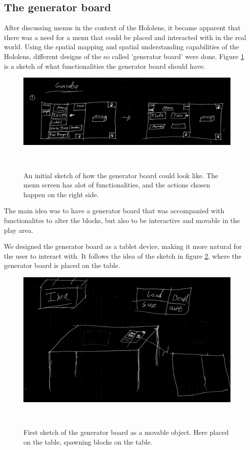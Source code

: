 \subsection{The generator board}
After discussing menus in the context of the Hololens, it became apparent that there was a need for a menu that could be placed and interacted with in the real world. Using the spatial mapping and spatial understanding capabilities of the Hololens, different designs of the so called 'generator board' were done. Figure \ref{fig:genboard1} is a sketch of what functionalities the generator board should have.
\begin{figure}[t]
	\centering
	\includegraphics[width=0.7\columnwidth]{figures/Generator/gen5.png}
	\caption{An initial sketch of how the generator board could look like. The menu screen has alot of functionalities, and the actions chosen happen on the right side.}~\label{fig:genboard1}
\end{figure}
The main idea was to have a generator board that was accompanied with functionalites to alter the blocks, but also to be interactive and movable in the play area.\par
We designed the generator board as a tablet device, making it more natural for the user to interact with. It follows the idea of the sketch in figure \ref{fig:gentablet}, where the generator board is placed on the table.
\begin{figure}[t]
	\centering
	\includegraphics[width=0.7\columnwidth]{figures/Generator/gen6.png}
	\caption{First sketch of the generator board as a movable object. Here placed on the table, spawning blocks on the table.}~\label{fig:gentablet}
\end{figure}
